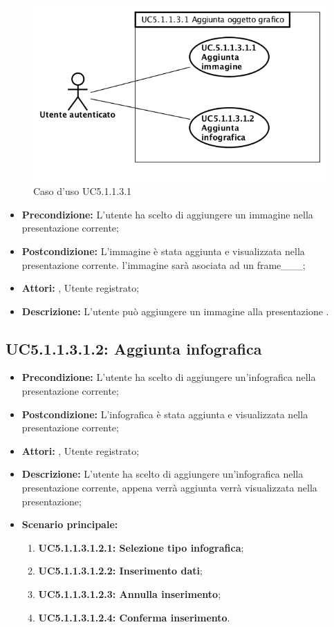 \begin{figure}[h]
	\begin{center}
	\includegraphics[scale=0.4]{diagram/UC5-1-1-3-1.png}
	\caption{Caso d'uso UC5.1.1.3.1}
	\end{center}
\end{figure}
\begin{itemize}
	\item \textbf{Precondizione:} L'utente ha scelto di aggiungere un immagine nella presentazione corrente;
	\item \textbf{Postcondizione:} L'immagine è stata aggiunta e visualizzata nella presentazione corrente. l'immagine sarà asociata ad un frame___;
	\item \textbf{Attori:} , Utente registrato;
	\item \textbf{Descrizione:} L'utente può aggiungere un immagine alla presentazione .
\end{itemize}
\subsection{ UC5.1.1.3.1.2: Aggiunta infografica}

\begin{itemize}
	\item \textbf{Precondizione:} L'utente ha scelto di aggiungere un'infografica  nella presentazione corrente;
	\item \textbf{Postcondizione:} L'infografica è stata aggiunta e visualizzata nella presentazione corrente;
	\item \textbf{Attori:} , Utente registrato;
	\item \textbf{Descrizione:} L'utente ha scelto di aggiungere un'infografica nella presentazione corrente, appena verrà aggiunta verrà visualizzata nella presentazione;
	\item \textbf{Scenario principale:}
	\begin{enumerate}
		\item \textbf{ UC5.1.1.3.1.2.1: Selezione tipo infografica};
		\item \textbf{ UC5.1.1.3.1.2.2: Inserimento dati};
		\item \textbf{ UC5.1.1.3.1.2.3: Annulla inserimento};
		\item \textbf{ UC5.1.1.3.1.2.4: Conferma inserimento}.
	\end{enumerate}
\end{itemize}
